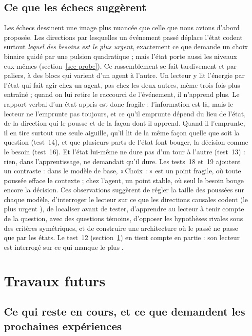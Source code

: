 \documentclass[11pt,a4paper]{article}
\newcommand{\Choix}{«\,Choix~:\,»}
\begin{document}
\subsection{Ce que les échecs suggèrent}

Les échecs dessinent une image plus nuancée que celle que nous avions d'abord
proposée. Les directions par lesquelles un événement passé déplace l'état codent
surtout \emph{lequel des besoins est le plus urgent}, exactement ce que demande un
choix binaire guidé par une pulsion quadratique ; mais l'état porte aussi les niveaux
eux-mêmes (section~\ref{sec-probe}). Ce rassemblement se fait tardivement et par
paliers, à des blocs qui varient d'un agent à l'autre. Un lecteur y lit l'énergie
par l'état qui fait agir chez un agent, pas chez les deux autres, même trois fois
plus entraîné ; quand on lui retire le raccourci de l'événement, il n'apprend plus.
Le rapport verbal d'un état appris est donc fragile : l'information est là, mais le
lecteur ne l'emprunte pas toujours, et ce qu'il emprunte dépend du lieu de l'état, de
la direction qui le pousse et de la façon dont il apprend. Quand il l'emprunte, il en
tire surtout une seule aiguille, qu'il lit de la même façon quelle que soit la question
(test~14), et que plusieurs parts de l'état font bouger, la décision comme le besoin
(test~16). Et l'état lui-même ne dure pas d'un tour à l'autre (test~13) : rien, dans
l'apprentissage, ne demandait qu'il dure. Les tests~18 et~19 ajoutent un contraste : dans le
modèle de base, \Choix{} est un point fragile, où toute poussée efface le contexte ; chez
l'agent, un point stable, où seul le besoin bouge encore la décision. Ces observations suggèrent
de régler la taille des poussées sur chaque modèle, d'interroger le
lecteur sur ce que les directions causales codent (\og le plus urgent \fg{}), de
localiser avant de tester, d'apprendre au lecteur à tenir compte de la question, avec
des questions témoins, d'opposer les hypothèses rivales sous des critères symétriques, et
de construire une architecture où le passé ne passe que par
les états. Le test~12 (section~\ref{sec-futur}) en tient compte en partie : son lecteur
est interrogé sur \og ce qui manque le plus \fg{}.

\section{Travaux futurs}
\label{sec-futur}

\subsection{Ce qui reste en cours, et ce que demandent les prochaines expériences}
\end{document}
